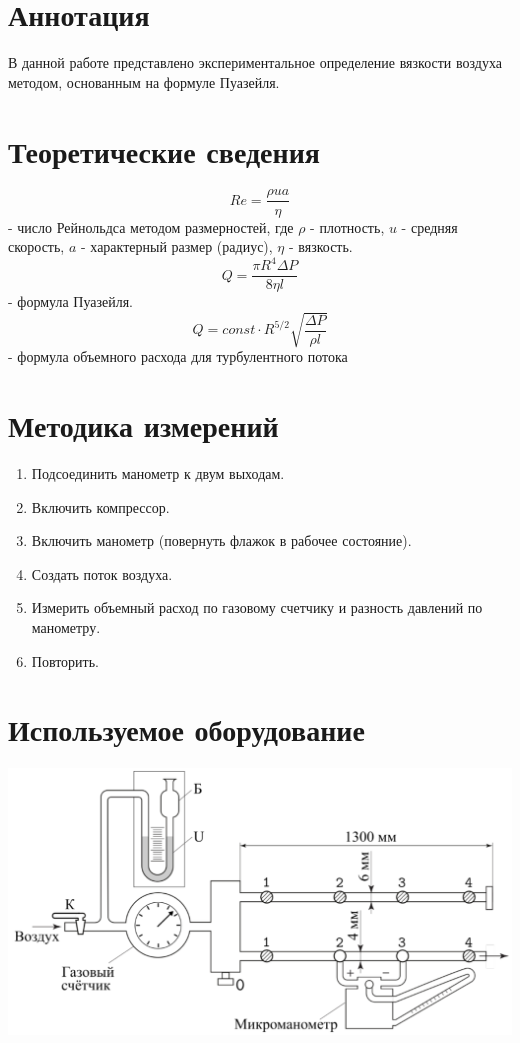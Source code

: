 \documentclass[1 pt]{article}
\begin{document}
\section{Аннотация}
В данной работе представлено экспериментальное определение вязкости воздуха методом, основанным на
формуле Пуазейля.
\section{Теоретические сведения}
\begin{equation}
    Re = \frac{\rho u a}{\eta}
\end{equation}
- число Рейнольдса методом размерностей, где $\rho$ - плотность, $u$ - средняя скорость, $a$ - характерный размер (радиус), $\eta$ - вязкость.
\begin{equation}
    Q = \frac{\pi R^4 \Delta P}{8 \eta l}
\end{equation}
- формула Пуазейля.
\begin{equation}
    Q = const \cdot R^{5/2} \sqrt{\frac{\Delta P}{\rho l}}
\end{equation}
- формула объемного расхода для турбулентного потока
\section{Методика измерений}
\begin{enumerate}
    \item Подсоединить манометр к двум выходам.
    \item Включить компрессор.
    \item Включить манометр (повернуть флажок в рабочее состояние).
    \item Создать поток воздуха.
    \item Измерить объемный расход по газовому счетчику и разность давлений по манометру.
    \item Повторить.
\end{enumerate}
\section{Используемое оборудование}
\begin{center}
    \includegraphics[scale=0.3]{physlabwork_5week_setup.png}
\end{center}
\end{document}
